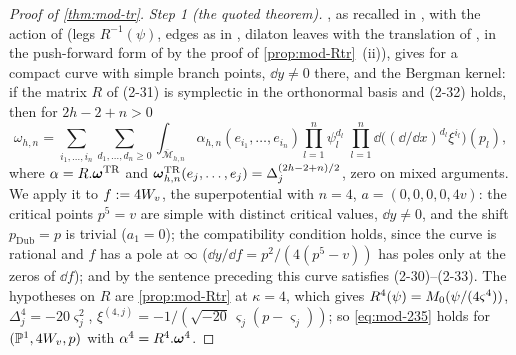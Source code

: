 \begin{proof}[Proof of \cref{thm:mod-tr}]
\emph{Step 1 (the quoted theorem).} \cite[Thm.~4.1]{DuninBarkowski:2012bw}, as recalled in \cite[\S2.6, (2-30)--(2-35)]{Dunin-Barkowski:2015caa}, with the action of \cite[\S2.3]{Dunin-Barkowski:2015caa} (legs $R^{-1}(\psi)$, edges as in \cite[Def.~2.2]{PPZ15}, dilaton leaves with the translation of \cite[Def.~2.13]{PPZ15}, in the push-forward form of \cite[Def.~2.5]{PPZ15} by the proof of \cref{prop:mod-Rtr}~(ii)), gives for a compact curve with simple branch points, $\dd y\neq 0$ there, and the Bergman kernel: if the matrix $R$ of (2-31) is symplectic in the orthonormal basis and (2-32) holds, then for $2h-2+n>0$
\begin{equation}
\label{eq:mod-235}
\omega_{h,n}=\sum_{i_1,\dots,i_n}\sum_{d_1,\dots,d_n\geq 0}\int_{\overline{\mathcal M}_{h,n}}\alpha_{h,n}(e_{i_1},\dots,e_{i_n})\prod_{l=1}^n\psi_l^{d_l}\;\prod_{l=1}^n\dd\big((\dd/\dd x)^{d_l}\xi^{i_l}\big)(p_l),
\end{equation}
where $\alpha=R.\boldsymbol{\omega}^{\mathrm{TR}}$ and $\boldsymbol{\omega}^{\mathrm{TR}}_{h,n}(e_j,\dots,e_j)=\Delta_j^{(2h-2+n)/2}$, zero on mixed arguments. We apply it to $f:=4W_{v}$, the superpotential \cite[(8-1)]{Dunin-Barkowski:2015caa} with $n=4$, $a=(0,0,0,0,4v)$: the critical points $p^5=v$ are simple with distinct critical values, $\dd y\neq 0$, and the shift $p_{\mathrm{Dub}}=p$ is trivial ($a_1=0$); the compatibility condition \cite[Prop.~4.3 (1)]{Dunin-Barkowski:2015caa} holds, since the curve is rational and $f$ has a pole at $\infty$ ($\dd y/\dd f=p^2/(4(p^5-v))$ has poles only at the zeros of $\dd f$); and by the sentence preceding \cite[Thm.~8.1]{Dunin-Barkowski:2015caa} this curve satisfies (2-30)--(2-33). The hypotheses on $R$ are \cref{prop:mod-Rtr} at $\kappa=4$, which gives $R^{4}(\psi)=M_{0}(\psi/(4\varsigma^4))$, $\Delta^{4}_j=-20\varsigma_j^2$, $\xi^{(4,j)}=-1/(\sqrt{-20}\,\varsigma_j(p-\varsigma_j))$; so \eqref{eq:mod-235} holds for $(\mathbb{P}^1,4W_{v},p)$ with $\alpha^{4}=R^{4}.\boldsymbol{\omega}^{4}$.


\end{proof}
